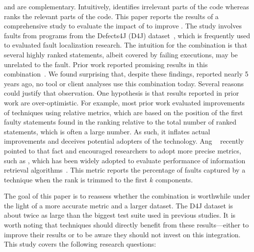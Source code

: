 \documentclass{article}
\begin{document}
\ds{} and \sfl{} are complementary. Intuitively, \ds{} identifies
irrelevant parts of the code whereas \sfl{} ranks the relevant parts
of the code.  This paper reports the results of a comprehensive study
to evaluate the impact of \ds{} to improve \sfl{}. The study involves
\numFaults{} faults from \numPrograms{} programs from the Defects4J (D4J)
dataset~\cite{just-defects4j-issta2014}, which is frequently used to
evaluated fault localization research. The intuition for the \comb{}
combination is that several highly ranked statements, albeit covered
by failing executions, may be unrelated to the fault. Prior work
reported promising results in this combination~\cite{Wotawa:2010:FLB:1848650.1849235,Alves:2011:FUD:2190078.2190115,DBLP:conf/ecai/HoferW12,lei-mao-dai-wang-2012,slicing-sfl-repair}.
We found surprising that, despite these findings, reported nearly 5
years ago, no tool or client analyses use this combination
today. Several reasons could justify that observation. One hypothesis is that results reported in prior work are
over-optimistic. For example, most prior work evaluated improvements
of \sfl{} techniques using relative metrics, which are based on the
position of the first faulty statements found in the ranking relative
to the total number of ranked statements, which is often a large
number. As such, it inflates actual improvements and deceives
potential adopters of the technology. Ang \etal~\cite{ang-perez-van-deursen-rui-2017} recently
pointed to that fact and encouraged researchers to adopt more precise metrics,
such as \topk{}
\cite{Wu:2014:CLC:2610384.2610386,Lucia:2014:FFL:2642937.2642983,Wen:2016:LLB:2970276.2970359},
which has been widely adopted to evaluate performance of information retrieval algorithms~. This
metric reports the percentage of faults captured by a technique when
the rank is trimmed to the first $k$ components.

The goal of this paper is to reassess whether the \comb{} combination
is worthwhile under the light of a more accurate metric and a larger
dataset. The D4J dataset is about twice as large than the biggest test
suite used in previous studies. It is worth noting that \acrAbrev{}
techniques should directly benefit from these results---either to
improve their results or to be aware they should not invest on this
integration. This study covers the following research questions:

\newcommand{\rqone}{How often does DS miss faulty statements?}
\newcommand{\rqthree}{How effective is the \comb{} combination?}
\end{document}
